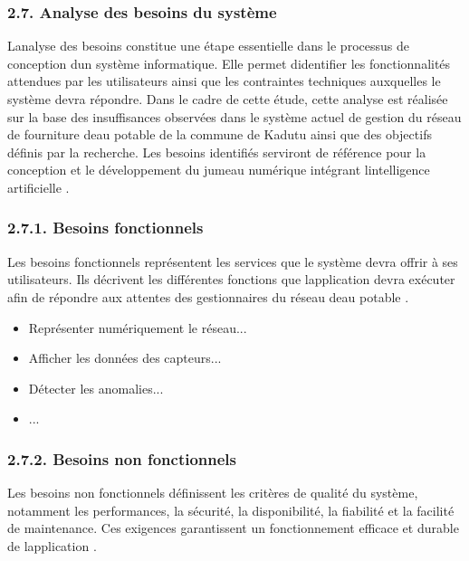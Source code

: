 \documentclass[12pt,a4paper,oneside]{report}
\begin{document}
\subsubsection{2.7. Analyse des besoins du
système}\label{analyse-des-besoins-du-systuxe8me}

L\textquotesingle analyse des besoins constitue une étape essentielle
dans le processus de conception d\textquotesingle un système
informatique. Elle permet d\textquotesingle identifier les
fonctionnalités attendues par les utilisateurs ainsi que les contraintes
techniques auxquelles le système devra répondre. Dans le cadre de cette
étude, cette analyse est réalisée sur la base des insuffisances
observées dans le système actuel de gestion du réseau de fourniture
d\textquotesingle eau potable de la commune de Kadutu ainsi que des
objectifs définis par la recherche. Les besoins identifiés serviront de
référence pour la conception et le développement du jumeau numérique
intégrant l\textquotesingle intelligence artificielle \cite{ref106}.

\subsubsection{2.7.1. Besoins fonctionnels}\label{besoins-fonctionnels}

Les besoins fonctionnels représentent les services que le système devra
offrir à ses utilisateurs. Ils décrivent les différentes fonctions que
l\textquotesingle application devra exécuter afin de répondre aux
attentes des gestionnaires du réseau d\textquotesingle eau potable
\cite{ref114}.

\begin{itemize}
\item
  Représenter numériquement le réseau...
\item
  Afficher les données des capteurs...
\item
  Détecter les anomalies...
\item
  ...
\end{itemize}

\subsubsection{2.7.2. Besoins non
fonctionnels}\label{besoins-non-fonctionnels}

Les besoins non fonctionnels définissent les critères de qualité du
système, notamment les performances, la sécurité, la disponibilité, la
fiabilité et la facilité de maintenance. Ces exigences garantissent un
fonctionnement efficace et durable de l\textquotesingle application
\cite{ref123}.
\end{document}
